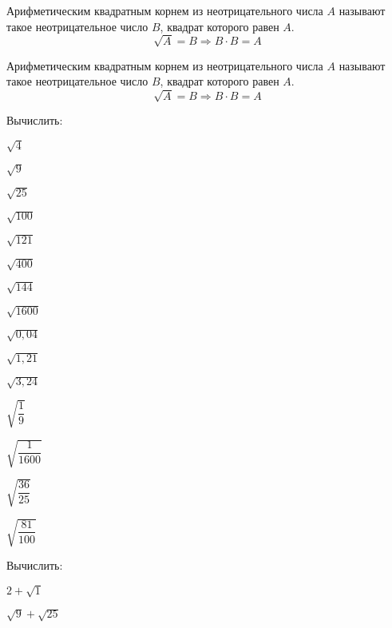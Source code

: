 %
%
\begin{class}[number=1]
	\begin{definit}
		Арифметическим квадратным корнем из неотрицательного числа \( A \) называют такое неотрицательное число \( B \), квадрат которого равен \( A \).
		\[ \sqrt{A}=B \Rightarrow B\cdot B = A \]
	\end{definit}
	\begin{definit}
		Арифметическим квадратным корнем из неотрицательного числа \( A \) называют такое неотрицательное число \( B \), квадрат которого равен \( A \).
		\[ \sqrt{A}=B \Rightarrow B\cdot B = A \]
	\end{definit}
	\begin{listofex}
		\item Вычислить:
		\begin{enumcols}[itemcolumns=6]
			\item \( \sqrt{4} \)
			\item \( \sqrt{9} \)
			\item \( \sqrt{25} \)
			\item \( \sqrt{100} \)
			\item \( \sqrt{121} \)
			\item \( \sqrt{400} \)
			\item \( \sqrt{144} \)
			\item \( \sqrt{1600} \)
			\item \( \sqrt{0,04} \)
			\item \( \sqrt{1,21} \)
			\item \( \sqrt{3,24} \)
			\item \( \sqrt{\dfrac{1}{9}} \)
			\item \( \sqrt{\dfrac{1}{1600}} \)
			\item \( \sqrt{\dfrac{36}{25}} \)
			\item \( \sqrt{\dfrac{81}{100}} \)
		\end{enumcols}
		\item Вычислить:
		\begin{enumcols}[itemcolumns=4]
			\item \( 2+\sqrt{1} \)
			\item \( \sqrt{9}+\sqrt{25} \)

\end{enumcols}
\end{listofex}
\end{class}
